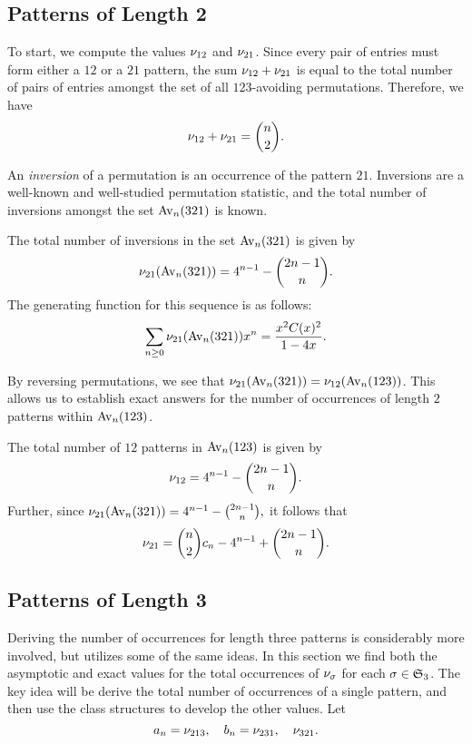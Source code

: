   \subsection{Patterns of Length 2}  

    To start, we compute the values $\nu_{12}$ and $\nu_{21}$. Since every pair
    of entries must form either a $12$ or a $21$ pattern, the sum $\nu_{12} +
    \nu_{21}$ is equal to the total number of pairs of entries amongst the set
    of all $123$-avoiding permutations. Therefore, we have 
    $$ \nu_{12} + \nu_{21} = \binom{n}{2}.$$

    An \emph{inversion}  of a permutation is an occurrence
    of the pattern $21$. Inversions are a well-known and well-studied
    permutation statistic, and the total number of inversions amongst the set
    $\operatorname{{Av}}_n(321)$ is known. 

    \begin{theorem} 
      The total number of inversions in the set $\operatorname{{Av}}_n(321)$ is given by 
      $$ \nu_{21}(\operatorname{{Av}}_n(321)) = 4^{n-1} - \binom{2n - 1}{n}.$$
      The generating function for this sequence is as follows:
      $$ \sum_{n \geq 0} \nu_{21}(\operatorname{{Av}}_n(321)) x^n = 
        \frac{x^2 C(x)^2}{1 - 4x}.$$
    \end{theorem}

    By reversing permutations, we see that $\nu_{21}(\operatorname{{Av}}_n(321)) =
    \nu_{12}(\operatorname{{Av}}_n(123))$. This allows us to establish exact answers for the
    number of occurrences of length $2$ patterns within $\operatorname{{Av}}_n(123)$. 

    \begin{proposition} \label{prop:2-patterns}
      The total number of $12$ patterns in $\operatorname{{Av}}_n(123)$ is given by 
      $$ \nu_{12} = 4^{n-1} - \binom{2n - 1}{n}.$$
      Further, since 
      $ \nu_{21}(\operatorname{{Av}}_n(321)) = 4^{n-1} - \binom{2n - 1}{n},$
      it follows that 
      $$ \nu_{21} = \binom{n}{2} c_n - 4^{n-1} + \binom{2n - 1}{n}.$$
    \end{proposition}

  \subsection{Patterns of Length 3}

    Deriving the number of occurrences for length three patterns is considerably
    more involved, but utilizes some of the same ideas. In this section we find
    both the asymptotic and exact values for the total occurrences of $\nu_\sigma$
    for each $\sigma \in \mathfrak{S}_3$.  The key idea will be derive the total number of
    occurrences of a single pattern, and then use the class structures to develop
    the other values. 
    Let 
    $$a_n = \nu_{213}, \quad b_n = \nu_{231}, \quad \nu_{321}.$$

